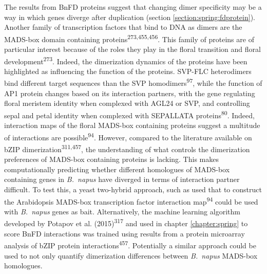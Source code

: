 \documentclass[12pt,]{book}
\begin{document}
The results from BnFD proteins suggest that changing dimer specificity
may be a way in which genes diverge after duplication (section
\ref{section:spring:fdprotein}). Another family of transcription factors
that bind to DNA as dimers are the MADS-box domain containing
proteins\textsuperscript{273,455,456}. This family of proteins are of
particular interest because of the roles they play in the floral
transition and floral development\textsuperscript{273}. Indeed, the
dimerization dynamics of the proteins have been highlighted as
influencing the function of the proteins. SVP-FLC heterodimers bind
different target sequences than the SVP homodimers\textsuperscript{97},
while the function of AP1 protein changes based on its interaction
partners, with the gene regulating floral meristem identity when
complexed with AGL24 or SVP, and controlling sepal and petal identity
when complexed with SEPALLATA proteins\textsuperscript{80}. Indeed,
interaction maps of the floral MADS-box containing proteins suggest a
multitude of interactions are possible\textsuperscript{94}. However,
compared to the literature available on bZIP
dimerization\textsuperscript{311,457}, the understanding of what
controls the dimerization preferences of MADS-box containing proteins is
lacking. This makes computationally predicting whether different
homologues of MADS-box containing genes in \emph{B.~napus} have diverged
in terms of interaction partner difficult. To test this, a yeast
two-hybrid approach, such as used that to construct the Arabidopsis
MADS-box transcription factor interaction map\textsuperscript{94} could
be used with \emph{B.~napus} genes as bait. Alternatively, the machine
learning algorithm developed by Potapov et al.
(2015)\textsuperscript{317} and used in chapter \ref{chapter:spring} to
score BnFD interactions was trained using results from a protein
microarray analysis of bZIP protein interactions\textsuperscript{457}.
Potentially a similar approach could be used to not only quantify
dimerization differences between \emph{B.~napus} MADS-box homologues.
\end{document}
